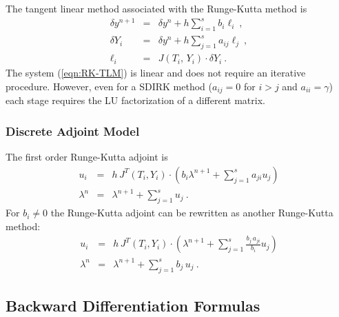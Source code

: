\documentclass[twoside]{article}
\begin{document}
The tangent linear method associated with the Runge-Kutta method is
%
\begin{eqnarray}
\label{eqn:RK-TLM}
\delta y^{n+1} &=& \delta y^n + h \sum_{i=1}^s b_i \ell_i~,\\
\nonumber
\delta Y_i& =& \delta y^n + h \sum_{j=1}^{s} a_{ij} \ell_j~,\\
\nonumber
\ell_i &=& J\left(T_i, \, Y_i \right) \cdot \delta Y_i ~.
\end{eqnarray}
%
The system (\ref{eqn:RK-TLM}) is linear and does not require an iterative
procedure. However, even for a SDIRK method  ($a_{ij}=0$ for $i>j$ and
$a_{ii}=\gamma$) each stage requires the LU factorization of a different
matrix.

\subsubsection{Discrete Adjoint Model}

The first order Runge-Kutta adjoint is
%
\begin{eqnarray}
\label{RK-adj}
u_i &=& h \, J^T(T_i,Y_i)\cdot
\left( b_i \lambda^{n+1} + \sum_{j=1}^s a_{ji} u_j \right)\\ %
\nonumber
\lambda^{n} &=& \lambda^{n+1} +\sum_{j=1}^s u_j~.
\end{eqnarray}
%
For $b_i \ne 0 $ the Runge-Kutta adjoint can be
rewritten as another Runge-Kutta method:
%
\begin{eqnarray}
\label{RK-adj-2}
u_i &=& h \, J^T(T_i,Y_i)\cdot
\left( \lambda^{n+1} + \sum_{j=1}^s \frac{b_j \,
a_{ji}}{b_i} u_j \right)\\ %
\nonumber
\lambda^{n} &=& \lambda^{n+1} +\sum_{j=1}^s b_j \, u_j~.
\end{eqnarray}

\subsection{Backward Differentiation Formulas}
\end{document}
